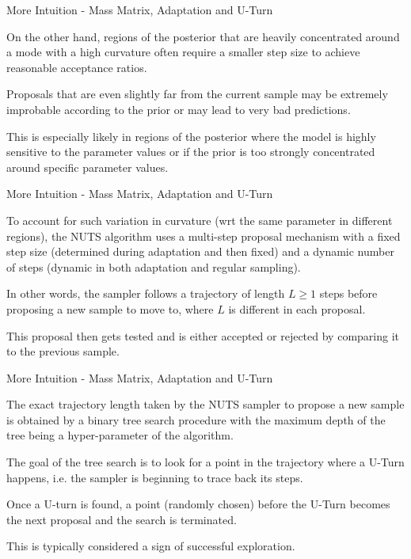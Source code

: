 \begin{frame}{More Intuition - Mass Matrix, Adaptation and U-Turn}
	\begin{vfilleditems}
		\item On the other hand, regions of the posterior that are heavily concentrated around a mode with a high curvature often require a smaller step size to achieve reasonable acceptance ratios.
		\item Proposals that are even slightly far from the current sample may be extremely improbable according to the prior or may lead to very bad predictions.
		\item This is especially likely in regions of the posterior where the model is highly sensitive to the parameter values or if the prior is too strongly concentrated around specific parameter values.
	\end{vfilleditems}
\end{frame}

\begin{frame}{More Intuition - Mass Matrix, Adaptation and U-Turn}
	\begin{vfilleditems}
		\item To account for such variation in curvature (wrt the same parameter in different regions), the NUTS algorithm uses a multi-step proposal mechanism with a fixed step size (determined during adaptation and then fixed) and a dynamic number of steps (dynamic in both adaptation and regular sampling).
		\item In other words, the sampler follows a trajectory of length $L \geq 1$ steps before proposing a new sample to move to, where $L$ is different in each proposal.
		\item This proposal then gets tested and is either accepted or rejected by comparing it to the previous sample.
	\end{vfilleditems}
\end{frame}

\begin{frame}{More Intuition - Mass Matrix, Adaptation and U-Turn}
	\begin{vfilleditems}
		\item The exact trajectory length taken by the NUTS sampler to propose a new sample is obtained by a binary tree search procedure with the maximum depth of the tree being a hyper-parameter of the algorithm.
		\item The goal of the tree search is to look for a point in the trajectory where a U-Turn happens, i.e. the sampler is beginning to trace back its steps.
		\item Once a U-turn is found, a point (randomly chosen) before the U-Turn becomes the next proposal and the search is terminated.
		\item This is typically considered a sign of successful exploration.
	\end{vfilleditems}
\end{frame}

